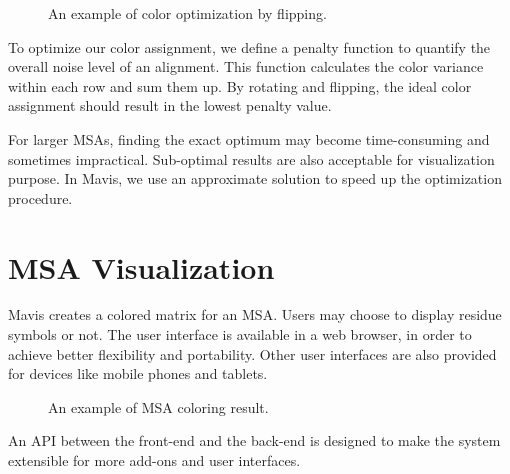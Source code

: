 \begin{figure}[hbt]
\caption[Color Optimization by Flipping]{An example of color optimization by flipping.}\label{fig:chap2_flip}
\end{figure}

To optimize our color assignment, we define a penalty function to quantify the overall noise level of an alignment. This function calculates the color variance within each row and sum them up. By rotating and flipping, the ideal color assignment should result in the lowest penalty value.

For larger MSAs, finding the exact optimum may become time-consuming and sometimes impractical. Sub-optimal results are also acceptable for visualization purpose. In Mavis, we use an approximate solution to speed up the optimization procedure.

\section{MSA Visualization}

Mavis creates a colored matrix for an MSA. Users may choose to display residue symbols or not. The user interface is available in a web browser, in order to achieve better flexibility and portability. Other user interfaces are also provided for devices like mobile phones and tablets.

\begin{figure}[hbt]
\caption[Example of MSA Coloring Result]{An example of MSA coloring result.}\label{fig:chap2_msa}
\end{figure}

An API between the front-end and the back-end is designed to make the system extensible for more add-ons and user interfaces.
